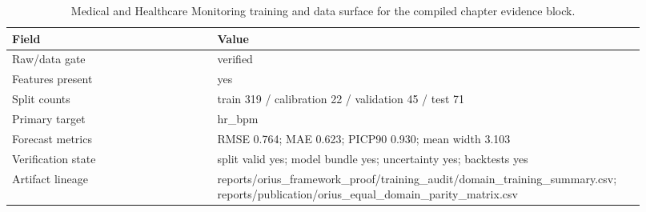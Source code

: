 \begin{table}[htbp]
\centering
\small
\caption{Medical and Healthcare Monitoring training and data surface for the compiled chapter evidence block.}
\label{tab:healthcare-training-surface}
\begin{tabular}{p{0.31\linewidth}p{0.61\linewidth}}
\toprule
\textbf{Field} & \textbf{Value}\\
\midrule
Raw/data gate & verified\\
Features present & yes\\
Split counts & train 319 / calibration 22 / validation 45 / test 71\\
Primary target & hr\_bpm\\
Forecast metrics & RMSE 0.764; MAE 0.623; PICP90 0.930; mean width 3.103\\
Verification state & split valid yes; model bundle yes; uncertainty yes; backtests yes\\
Artifact lineage & reports/orius\_framework\_proof/training\_audit/domain\_training\_summary.csv; reports/publication/orius\_equal\_domain\_parity\_matrix.csv\\
\bottomrule
\end{tabular}
\end{table}
